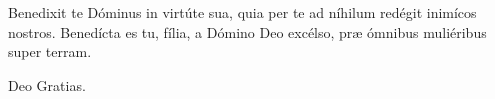 
Benedixit te Dóminus in virtúte sua, quia per te ad níhilum redégit inimícos nostros. Benedícta es tu, fília, a Dómino Deo excélso, præ ómnibus muliéribus super terram.

\rubric{\Rbar}Deo Gratias.